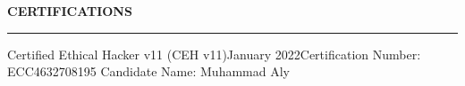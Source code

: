 \noindent\textcolor{themecolor}{\textbf{CERTIFICATIONS}}

\vspace{2mm}
\hrule
\vspace{3mm}

\begin{verbose}{Certified Ethical Hacker v11 (CEH v11)}{January 2022}{Certification Number: ECC4632708195}
    \noindent Candidate Name: Muhammad Aly
\end{verbose}

